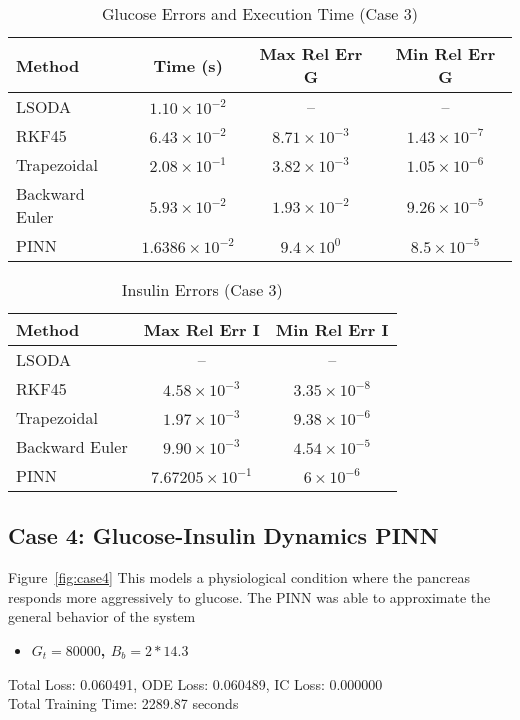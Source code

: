 \documentclass[conference]{IEEEtran}
\begin{document}
\begin{table}[H]
\centering
\caption{Glucose Errors and Execution Time (Case 3)}
\begin{tabular}{|l|c|c|c|}
\hline
\textbf{Method} & \textbf{Time (s)} & \textbf{Max Rel Err G} & \textbf{Min Rel Err G} \\
\hline
LSODA & $1.10 \times 10^{-2}$ & -- & -- \\
RKF45 & $6.43 \times 10^{-2}$ & $8.71 \times 10^{-3}$ & $1.43 \times 10^{-7}$ \\
Trapezoidal & $2.08 \times 10^{-1}$ & $3.82 \times 10^{-3}$ & $1.05 \times 10^{-6}$ \\
Backward Euler & $5.93 \times 10^{-2}$ & $1.93 \times 10^{-2}$ & $9.26 \times 10^{-5}$ \\
PINN & $1.6386  \times 10^{-2}$ & $9.4 \times 10^{0}$ & $8.5 \times 10^{-5}$ \\
\hline
\end{tabular}
\end{table}
\vspace{-0.7cm}

\begin{table}[H]
\centering
\caption{Insulin Errors (Case 3)}
\begin{tabular}{|l|c|c|}
\hline
\textbf{Method} & \textbf{Max Rel Err I} & \textbf{Min Rel Err I} \\
\hline
LSODA & -- & -- \\
RKF45 & $4.58 \times 10^{-3}$ & $3.35 \times 10^{-8}$ \\
Trapezoidal & $1.97 \times 10^{-3}$ & $9.38 \times 10^{-6}$ \\
Backward Euler & $9.90 \times 10^{-3}$ & $4.54 \times 10^{-5}$ \\
PINN & $7.67205 \times 10^{-1}$ & $6 \times 10^{-6}$ \\
\hline
\end{tabular}
\end{table}

\subsection{Case 4: Glucose-Insulin Dynamics PINN}
Figure~\ref{fig:case4} This models a physiological condition where the pancreas responds more aggressively to glucose. The PINN was able to approximate the general behavior of the system
\begin{itemize}
\item \textbf{ $G_t = 80000$, $B_b = 2 * 14.3$} \\
\end{itemize}
Total Loss: 0.060491, ODE Loss: 0.060489, IC Loss: 0.000000\\
Total Training Time:   2289.87 seconds
\end{document}
